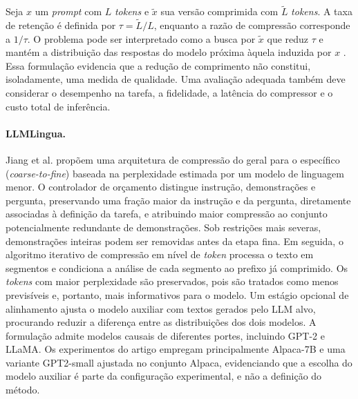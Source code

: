 Seja $x$ um \textit{prompt} com $L$ \textit{tokens} e $\widetilde{x}$ sua versão comprimida com $\widetilde{L}$ \textit{tokens}. A taxa de retenção é definida por $\tau=\widetilde{L}/L$, enquanto a razão de compressão corresponde a $1/\tau$. O problema pode ser interpretado como a busca por $\widetilde{x}$ que reduz $\tau$ e mantém a distribuição das respostas do modelo próxima àquela induzida por $x$ \cite{jiang2023llmlingua}. Essa formulação evidencia que a redução de comprimento não constitui, isoladamente, uma medida de qualidade. Uma avaliação adequada também deve considerar o desempenho na tarefa, a fidelidade, a latência do compressor e o custo total de inferência.

\paragraph{LLMLingua.}
Jiang et al. \cite{jiang2023llmlingua} propõem uma arquitetura de compressão do geral para o específico (\textit{coarse-to-fine}) baseada na perplexidade estimada por um modelo de linguagem menor. O controlador de orçamento distingue instrução, demonstrações e pergunta, preservando uma fração maior da instrução e da pergunta, diretamente associadas à definição da tarefa, e atribuindo maior compressão ao conjunto potencialmente redundante de demonstrações. Sob restrições mais severas, demonstrações inteiras podem ser removidas antes da etapa fina. Em seguida, o algoritmo iterativo de compressão em nível de \textit{token} processa o texto em segmentos e condiciona a análise de cada segmento ao prefixo já comprimido. Os \textit{tokens} com maior perplexidade são preservados, pois são tratados como menos previsíveis e, portanto, mais informativos para o modelo. Um estágio opcional de alinhamento ajusta o modelo auxiliar com textos gerados pelo LLM alvo, procurando reduzir a diferença entre as distribuições dos dois modelos. A formulação admite modelos causais de diferentes portes, incluindo GPT-2 e LLaMA. Os experimentos do artigo empregam principalmente Alpaca-7B e uma variante GPT2-small ajustada no conjunto Alpaca, evidenciando que a escolha do modelo auxiliar é parte da configuração experimental, e não a definição do método.

